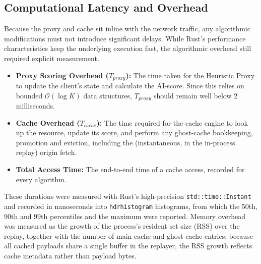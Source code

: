 \subsection{Computational Latency and Overhead}
Because the proxy and cache sit inline with the network traffic, any algorithmic modifications must not introduce significant delays. While Rust's performance characteristics keep the underlying execution fast, the algorithmic overhead still required explicit measurement.

\begin{itemize}
    \item \textbf{Proxy Scoring Overhead ($T_{proxy}$):} The time taken for the Heuristic Proxy to update the client's state and calculate the AI-score. Since this relies on bounded $\mathcal{O}(\log K)$ data structures, $T_{proxy}$ should remain well below 2 milliseconds.
    \item \textbf{Cache Overhead ($T_{cache}$):} The time required for the cache engine to look up the resource, update its score, and perform any ghost-cache bookkeeping, promotion and eviction, including the (instantaneous, in the in-process replay) origin fetch.
    \item \textbf{Total Access Time:} The end-to-end time of a cache access, recorded for every algorithm.
\end{itemize}

These durations were measured with Rust's high-precision \texttt{std::time::Instant} and recorded in nanoseconds into \texttt{hdrhistogram} histograms, from which the 50th, 90th and 99th percentiles and the maximum were reported. Memory overhead was measured as the growth of the process's resident set size (RSS) over the replay, together with the number of main-cache and ghost-cache entries; because all cached payloads share a single buffer in the replayer, the RSS growth reflects cache metadata rather than payload bytes.
